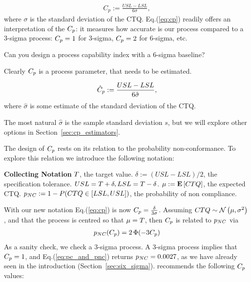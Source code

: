 \begin{definition}[$\cp$]
\begin{align}
\label{eq:cp}
	C_p:= \frac{USL-LSL}{6 \sigma}, 
\end{align}
where $\sigma$ is the standard deviation of the CTQ.
Eq.(\ref{eq:cp}) readily offers an interpretation of the $\cp$: it measures how accurate is our process compared to a 3-sigma process: $C_p=1$ for 3-sigma, $C_p=2$ for 6-sigma, etc.

\begin{think}
Can you design a process capability index with a 6-sigma baseline? 
\end{think}


\end{definition}
Clearly $\cp$ is a process parameter, that needs to be estimated.
\begin{definition}[$\cpHat$]
\begin{align}
	\hat{C}_p:= \frac{USL-LSL}{6 \hat{\sigma}}, 
\end{align}
where $\hat{\sigma}$ is some estimate of the standard deviation of the CTQ.
\end{definition}
The most natural $\hat{\sigma}$ is the sample standard deviation $s$, but we will explore other options in Section~\ref{sec:cp_estimators}.


The design of $\cp$ rests on its relation to the probability non-conformance. 
To explore this relation we introduce the following notation:
\begin{tcolorbox}
\footnotesize
\textbf{Collecting Notation} \newline
$T$, the target value. \newline
$\delta:= (USL-LSL)/2$, the specification tolerance. $USL=T+\delta, LSL=T-\delta$.  \newline
$\mu:= \mathbf{E}\left[ CTQ \right]$, the expected CTQ. \newline
$p_{NC}:= 1-P(CTQ \in [LSL,USL])$, the probability of non compliance. 
\end{tcolorbox}

With our new notation Eq.(\ref{eq:cp}) is now $C_p=\frac{\delta}{3 \sigma}$.
Assuming $CTQ \sim \mathcal{N}\left(\mu, \sigma^2\right)$, and that the process is centred so that $\mu=T$, then $\cp$ is related to $p_{NC}$ via
\begin{align}
\label{eq:pc_and_pnc}
	p_{NC}(C_p) = 2\, \Phi(-3 C_p)
\end{align}
As a sanity check, we check a 3-sigma process.
A 3-sigma process implies that $C_p=1$, and Eq.(\ref{eq:pc_and_pnc}) returns $p_{NC}=0.0027$, as we have already seen in the introduction (Section~\ref{sec:six_sigma}).
\cite{montgomery_introduction_2007} recommends the following $\cp$ values:

